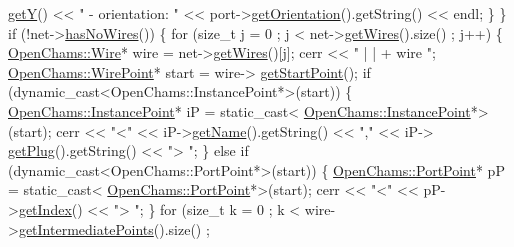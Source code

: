 \begin{DoxyCodeInclude}
      \hyperlink{class_open_chams_1_1_port_aafa51c7f8f38a09febbb9ce7853f77b4}{getY}() << \textcolor{stringliteral}{" - orientation: "} << port->\hyperlink{class_open_chams_1_1_port_ace51e4bf9cee0319600c14723efa0dfb}{getOrientation}().getString() << endl;
                    \}
                \}
                \textcolor{keywordflow}{if} (!net->\hyperlink{class_open_chams_1_1_net_ac9470e72b26d4cddef3d13e69057ee54}{hasNoWires}()) \{
                    \textcolor{keywordflow}{for} (\textcolor{keywordtype}{size\_t} j = 0 ; j < net->\hyperlink{class_open_chams_1_1_net_a2f8bcf7cad7711850efeca408f146b8a}{getWires}().size() ; j++) \{
                        \hyperlink{class_open_chams_1_1_wire}{OpenChams::Wire}* wire = net->\hyperlink{class_open_chams_1_1_net_a2f8bcf7cad7711850efeca408f146b8a}{getWires}()[j];
                        cerr << \textcolor{stringliteral}{" | | + wire  "};
                        \hyperlink{class_open_chams_1_1_wire_point}{OpenChams::WirePoint}* start = wire->
      \hyperlink{class_open_chams_1_1_wire_ad68ddfcb6d4cbbe3c06d03fb4350dcdb}{getStartPoint}();
                        \textcolor{keywordflow}{if} (dynamic\_cast<OpenChams::InstancePoint*>(start)) \{
                            \hyperlink{class_open_chams_1_1_instance_point}{OpenChams::InstancePoint}* iP = \textcolor{keyword}{static\_cast<}
      \hyperlink{class_open_chams_1_1_instance_point}{OpenChams::InstancePoint}*\textcolor{keyword}{>}(start);
                            cerr << \textcolor{stringliteral}{"<"} << iP->\hyperlink{class_open_chams_1_1_instance_point_a2858c0c4e8b5108f041237cf5a802029}{getName}().getString() << \textcolor{stringliteral}{","} << iP->
      \hyperlink{class_open_chams_1_1_instance_point_a646d464666fc56ab2e04a6b87fdd3279}{getPlug}().getString() << \textcolor{stringliteral}{"> "};
                        \} \textcolor{keywordflow}{else} \textcolor{keywordflow}{if} (dynamic\_cast<OpenChams::PortPoint*>(start)) \{
                            \hyperlink{class_open_chams_1_1_port_point}{OpenChams::PortPoint}* pP = \textcolor{keyword}{static\_cast<}
      \hyperlink{class_open_chams_1_1_port_point}{OpenChams::PortPoint}*\textcolor{keyword}{>}(start);
                            cerr << \textcolor{stringliteral}{"<"} << pP->\hyperlink{class_open_chams_1_1_port_point_ab4018980dcd1fed5208e7a72846cd815}{getIndex}() << \textcolor{stringliteral}{"> "};
                        \}
                        \textcolor{keywordflow}{for} (\textcolor{keywordtype}{size\_t} k = 0 ; k < wire->\hyperlink{class_open_chams_1_1_wire_aac2840e22e03db0ff2c0fe0f83c56fdd}{getIntermediatePoints}().size() ;

\end{DoxyCodeInclude}
